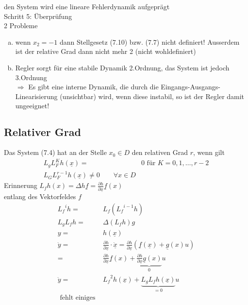\documentclass[ngerman]{tudscrreprt}
\begin{document}
den System wird eine lineare Fehlerdynamik aufgeprägt\\
Schritt 5: Überprüfung\\
2 Probleme\\
\begin{enumerate}[a)]
\item wenn $x_2 = -1$ dann Stellgesetz (7.10) bzw. (7.7) nicht definiert! Ausserdem ist der relative Grad dann nicht mehr 2 (nicht wohldefiniert)
\item Regler sorgt für eine stabile Dynamik 2.Ordnung, das System ist jedoch 3.Ordnung\\
$\Rightarrow$ Es gibt eine interne Dynamik, die durch die Eingangs-Ausgangs-Linearisierung (unsichtbar) wird,  wenn diese instabil, so ist der Regler damit ungeeignet!
\end{enumerate}
\subsection{Relativer Grad}
Das System (7.4) hat an der Stelle $x_0 \in D$ den relativen Grad $r$, wenn gilt \\
\begin{align*}
L_g L_F ^K h(\underline x)  =& 0 \text{  für  } K= 0,1,\dots, r-2\\
L_G L_F ^{r-1} h(\underline x) \ne 0 \qquad \forall x\in D
\end{align*}
Erinnerung $L_f h(x) = \Delta h \underline f = \frac{\partial h}{\partial \underline x} \underline f(x)$\\
entlang des Vektorfeldes $f$\\
\begin{align*}
{L_f}^i h =& L_f ({L_f}^{i-1} h)\\
L_g L_f h=& \Delta (L_f h )g\\
y =& h(\underline x)\\
\dot y = &\frac{\partial h}{\partial \underline x} \cdot \dot {\underline x} = \frac{\partial h}{\partial \underline x} (\underline f(\underline x) + \underline g(x)u)\\
=&\frac{\partial h}{\partial \underline x}\underline f(x) + \underbrace{\frac{\partial h}{\partial \underline x} \underline g(x)}_{0}u\\
\ddot y=& {L_f}^2 h(\underline x) + \underbrace{L_g L_f h(\underline x)}_{=0} u\\
\text{  fehlt einiges }
\end{align*}
\end{document}
